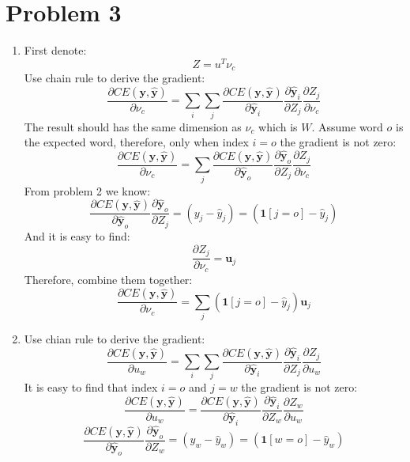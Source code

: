 \documentclass[10pt]{article}
\begin{document}
\section*{Problem 3}
\begin{enumerate}[label=(\alph*)]
\item
First denote:
\begin{equation*}
	Z = u^{T}\nu_c
\end{equation*}
Use chain rule to derive the gradient:
\begin{equation*}
	\frac{\partial CE(\mathbf{y}, \mathbf{\hat{y}})}{\partial \nu_c} = \sum_{i}\sum_{j}\frac{\partial CE(\mathbf{y}, \mathbf{\hat{y}})}{\partial \mathbf{\hat{y}}_i}\frac{\partial \mathbf{\hat{y}}_i}{\partial Z_j}\frac{\partial Z_j}{\partial \nu_c}
\end{equation*}
The result should has the same dimension as $\nu_c$ which is $W$. Assume word $o$ is the expected word, therefore, only when index $i = o$ the gradient is not zero:
\begin{equation*}
	\frac{\partial CE(\mathbf{y}, \mathbf{\hat{y}})}{\partial \nu_c} = \sum_{j}\frac{\partial CE(\mathbf{y}, \mathbf{\hat{y}})}{\partial \mathbf{\hat{y}}_o}\frac{\partial \mathbf{\hat{y}}_o}{\partial Z_j}\frac{\partial Z_j}{\partial \nu_c}
\end{equation*}
From problem 2 we know:
\begin{equation*}
	\frac{\partial CE(\mathbf{y}, \mathbf{\hat{y}})}{\partial \mathbf{\hat{y}}_o}\frac{\partial \mathbf{\hat{y}}_o}{\partial Z_j} = (y_j - \hat{y}_j) = (\mathbf{1}[j=o] - \hat{y}_j)
\end{equation*}
And it is easy to find:
\begin{equation*}
	\frac{\partial Z_j}{\partial \nu_c} = \mathbf{u}_j
\end{equation*}
Therefore, combine them together:
\begin{equation*}
	\frac{\partial CE(\mathbf{y}, \mathbf{\hat{y}})}{\partial \nu_c} = \sum_j(\mathbf{1}[j=o] - \hat{y}_j)\mathbf{u}_j
\end{equation*}

\item
Use chian rule to derive the gradient:
\begin{equation*}
	\frac{\partial CE(\mathbf{y}, \mathbf{\hat{y}})}{\partial u_w} = \sum_{i}\sum_{j}\frac{\partial CE(\mathbf{y}, \mathbf{\hat{y}})}{\partial \mathbf{\hat{y}}_i}\frac{\partial \mathbf{\hat{y}}_i}{\partial Z_j}\frac{\partial Z_j}{\partial u_w}
\end{equation*}
It is easy to find that index $i=o$ and $j=w$ the gradient is not zero:
\begin{equation*}
	\frac{\partial CE(\mathbf{y}, \mathbf{\hat{y}})}{\partial u_w} = \frac{\partial CE(\mathbf{y}, \mathbf{\hat{y}})}{\partial \mathbf{\hat{y}}_i}\frac{\partial \mathbf{\hat{y}}_i}{\partial Z_w}\frac{\partial Z_w}{\partial u_w}
\end{equation*}
\begin{equation*}
	\frac{\partial CE(\mathbf{y}, \mathbf{\hat{y}})}{\partial \mathbf{\hat{y}}_o}\frac{\partial \mathbf{\hat{y}}_o}{\partial Z_w} = (y_w - \hat{y}_w) = (\mathbf{1}[w=o] - \hat{y}_w)
\end{equation*}


\end{enumerate}
\end{document}
